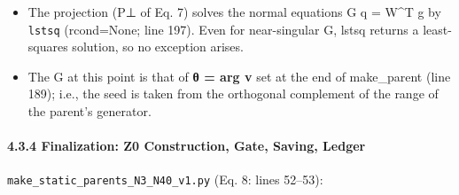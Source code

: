 \documentclass[
  a4paper,
]{ltjsarticle}
\providecommand{\tightlist}{%
  \setlength{\itemsep}{0pt}\setlength{\parskip}{0pt}}
\begin{document}
\begin{itemize}
\tightlist
\item
  The projection (P⊥ of Eq. 7) solves the normal equations G q = W\^{}T
  g by \texttt{lstsq} (rcond=None; line 197). Even for near-singular G,
  lstsq returns a least-squares solution, so no exception arises.
\item
  The G at this point is that of \textbf{θ = arg v} set at the end of
  make\_parent (line 189); i.e., the seed is taken from the orthogonal
  complement of the range of the parent's generator.
\end{itemize}

\paragraph{4.3.4 Finalization: Z0 Construction, Gate, Saving,
Ledger}\label{finalization-z0-construction-gate-saving-ledger}

\texttt{make\_static\_parents\_N3\_N40\_v1.py} (Eq. 8: lines 52--53):
\end{document}
